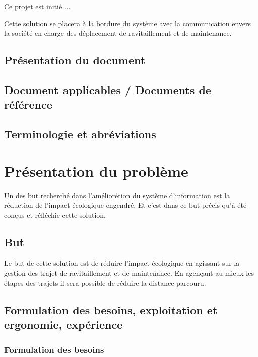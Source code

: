         Ce projet est initié ... %
        
        Cette solution se placera à la bordure du système avec la communication envers la société en charge des déplacement de ravitaillement et de maintenance.
        
    \subsection{Présentation du document}
        
        
    \subsection{Document applicables / Documents de référence}
    
    \subsection{Terminologie et abréviations}
    
\section{Présentation du problème}
        
        Un des but recherché dans l'améliorétion du système d'information est la réduction de l'impact écologique engendré. Et c'est dans ce but précis qu'à été conçus et réfléchie cette solution.
        
    \subsection{But}
    
        Le but de cette solution est de réduire l'impact écologique en agissant sur la gestion des trajet de ravitaillement et de maintenance. En agençant au mieux les étapes des trajets il sera possible de réduire la distance parcouru.
        
    \subsection{Formulation des besoins, exploitation et ergonomie, expérience}
    
        \subsubsection{Formulation des besoins}
            

